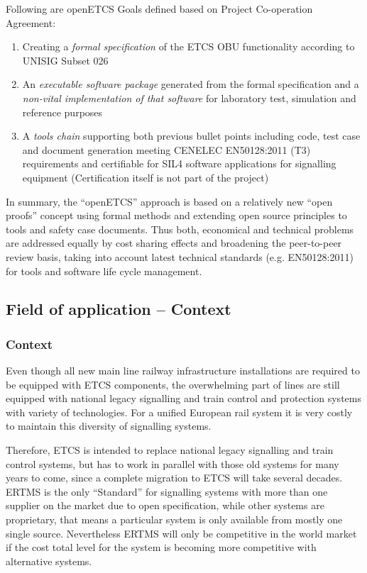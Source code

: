 \documentclass{template/openetcs_article}
\begin{document}
Following are openETCS Goals defined based on Project Co-operation Agreement:

\begin{enumerate}
\item Creating a \emph{formal specification} of the ETCS OBU functionality according to UNISIG Subset 026

\item An \emph{executable software package} generated from the formal specification and a \emph{non-vital implementation of that software} for laboratory test, simulation and reference purposes

\item A \emph{tools chain} supporting both previous bullet points including code, test case and document generation meeting CENELEC EN50128:2011 (T3) requirements and certifiable for SIL4 software applications for signalling equipment (Certification itself is not part of the project)
\end{enumerate}


In summary, the ``openETCS'' approach is based on a relatively new ``open proofs'' concept using formal methods and extending open source principles to tools and safety case documents. Thus both, economical and technical problems are addressed equally by cost sharing effects and broadening the peer-to-peer review basis, taking into account latest technical standards (e.g. EN50128:2011) for tools and software life cycle management.


\subsection{Field of application -- Context}
\subsubsection{Context}
Even though all new main line railway infrastructure installations are required to be equipped with ETCS components, the overwhelming part of lines are still equipped with national legacy signalling and train control and protection systems with variety of technologies. For a unified European rail system it is very costly to maintain this diversity of signalling systems.

Therefore, ETCS is intended to replace national legacy signalling and train control systems, but has to work in parallel with those old systems for many years to come, since a complete migration to ETCS will take several decades. ERTMS is the only ``Standard'' for signalling systems with more than one supplier on the market due to open specification, while other systems are proprietary, that means a particular system is only available from mostly one single source. Nevertheless ERTMS will only be competitive in the world market if the cost total level for the system is becoming more competitive with alternative systems.
\end{document}
